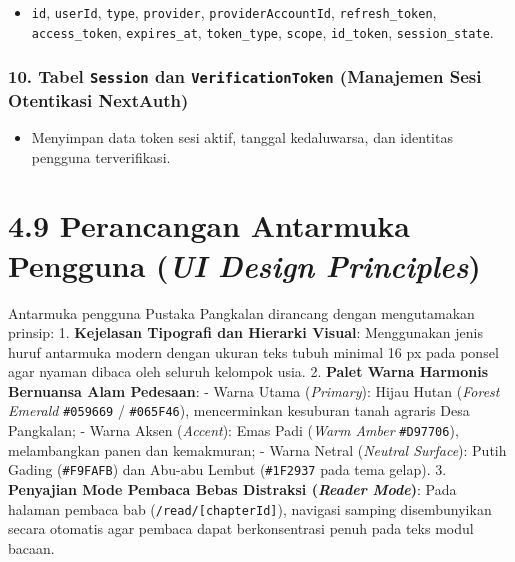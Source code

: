 \documentclass[
  indonesian,
  12pt,
]{report}
\providecommand{\tightlist}{%
  \setlength{\itemsep}{0pt}\setlength{\parskip}{0pt}}
\begin{document}
\begin{itemize}
\tightlist
\item
  \texttt{id}, \texttt{userId}, \texttt{type}, \texttt{provider},
  \texttt{providerAccountId}, \texttt{refresh\_token},
  \texttt{access\_token}, \texttt{expires\_at}, \texttt{token\_type},
  \texttt{scope}, \texttt{id\_token}, \texttt{session\_state}.
\end{itemize}

\subsubsection{\texorpdfstring{10. Tabel \texttt{Session} dan
\texttt{VerificationToken} (Manajemen Sesi Otentikasi
NextAuth)}{10. Tabel Session dan VerificationToken (Manajemen Sesi Otentikasi NextAuth)}}\label{tabel-session-dan-verificationtoken-manajemen-sesi-otentikasi-nextauth}

\begin{itemize}
\tightlist
\item
  Menyimpan data token sesi aktif, tanggal kedaluwarsa, dan identitas
  pengguna terverifikasi.
\end{itemize}

\section{\texorpdfstring{4.9 Perancangan Antarmuka Pengguna (\emph{UI
Design
Principles})}{4.9 Perancangan Antarmuka Pengguna (UI Design Principles)}}\label{perancangan-antarmuka-pengguna-ui-design-principles}

Antarmuka pengguna Pustaka Pangkalan dirancang dengan mengutamakan
prinsip: 1. \textbf{Kejelasan Tipografi dan Hierarki Visual}:
Menggunakan jenis huruf antarmuka modern dengan ukuran teks tubuh
minimal 16 px pada ponsel agar nyaman dibaca oleh seluruh kelompok usia.
2. \textbf{Palet Warna Harmonis Bernuansa Alam Pedesaan}: - Warna Utama
(\emph{Primary}): Hijau Hutan (\emph{Forest Emerald} \texttt{\#059669} /
\texttt{\#065F46}), mencerminkan kesuburan tanah agraris Desa Pangkalan;
- Warna Aksen (\emph{Accent}): Emas Padi (\emph{Warm Amber}
\texttt{\#D97706}), melambangkan panen dan kemakmuran; - Warna Netral
(\emph{Neutral Surface}): Putih Gading (\texttt{\#F9FAFB}) dan Abu-abu
Lembut (\texttt{\#1F2937} pada tema gelap). 3. \textbf{Penyajian Mode
Pembaca Bebas Distraksi (\emph{Reader Mode})}: Pada halaman pembaca bab
(\texttt{/read/{[}chapterId{]}}), navigasi samping disembunyikan secara
otomatis agar pembaca dapat berkonsentrasi penuh pada teks modul bacaan.
\end{document}
